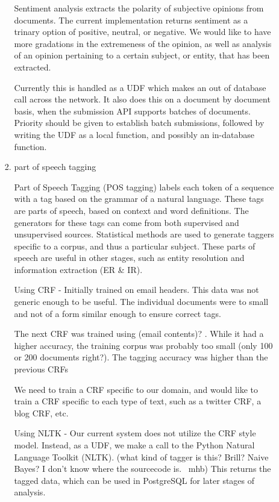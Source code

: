 \documentclass{article}
\begin{document}
\begin{enumerate}
\begin{enumerate}
\begin{enumerate}
      Sentiment analysis extracts the polarity of subjective opinions from documents.
      The current implementation returns sentiment as a trinary option of positive, neutral, or negative.
      We would like to have more gradations in the extremeness of the opinion,
      as well as analysis of an opinion pertaining to a certain subject, or entity, that has been extracted.

      Currently this is handled as a UDF which makes an out of database call across the network.
      It also does this on a document by document basis,
      when the submission API supports batches of documents.
      Priority should be given to establish batch submissions,
      followed by writing the UDF as a local function,
      and possibly an in-database function.

    \item part of speech tagging

      Part of Speech Tagging (POS tagging) labels each token of a sequence with a tag based on the grammar of a natural language.
      These tags are parts of speech, based on context and word definitions.
      The generators for these tags can come from both supervised and unsupervised sources.
      Statistical methods are used to generate taggers specific to a corpus, and thus a particular subject.
      These parts of speech are useful in other stages, such as entity resolution and information extraction (ER \& IR).

      Using CRF -
      Initially trained on email headers.
      This data was not generic enough to be useful.
      The individual documents were to small and not of a form similar enough to ensure correct tags.

      The next CRF was trained using (email contents)? .
      While it had a higher accuracy, the training corpus was probably too small (only 100 or 200 documents right?).
      The tagging accuracy was higher than the previous CRFs

      We need to train a CRF specific to our domain,
      and would like to train a CRF specific to each type of text,
      such as a twitter CRF, a blog CRF, etc.

      Using NLTK -
      Our current system does not utilize the CRF style model.
      Instead, as a UDF, we make a call to the Python Natural Language Toolkit (NLTK).
      (what kind of tagger is this? Brill? Naive Bayes? I don't know where the sourcecode is. ~mhb)
      This returns the tagged data, which can be used in PostgreSQL for later stages of analysis.



\end{enumerate}
\end{enumerate}
\end{enumerate}
\end{document}
